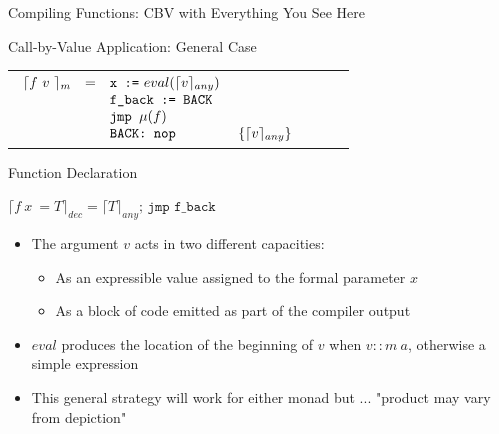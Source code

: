 \documentclass{beamer}
\begin{document}
\begin{frame}{Compiling Functions: CBV with Everything You See Here}

\begin{structure}{Call-by-Value Application: General Case}
\begin{onlinebox}{10cm}

\begin{tabular}[t]{llll}
$
\begin{array}[t]{llll}

\lceil f\ v\ \rceil_m &= &\texttt{x :=}\ eval (\lceil v \rceil_{any})\\
&&\texttt{f\_back := BACK}\\
&&\texttt{jmp }\mu(f)\\
&&\texttt{BACK: nop}&\ \{\lceil v \rceil_{any} \} \\
\end{array}
$
\end{tabular}

\end{onlinebox}
\end{structure}

\medskip

\begin{structure}{Function Declaration}
\begin{onlinebox}{9cm}

$\lceil f\ x\ = T\rceil_{dec} = \lceil T \rceil_{any}\texttt{; jmp f\_back}$

\end{onlinebox}
\end{structure}

\begin{itemize}

\item{The argument $v$ acts in two different capacities:}

  \begin{itemize}
  
  \item{As an expressible value assigned to the formal parameter $x$}
  
  \item{As a block of code emitted as part of the compiler output}
  
  \end{itemize}
  
\item{$eval$ produces the location of the beginning of $v$ when $v :: m\ a$, otherwise a simple expression}

\item{This general strategy will work for either monad but ... "product may vary from depiction"}

\end{itemize}

\end{frame}
\end{document}
